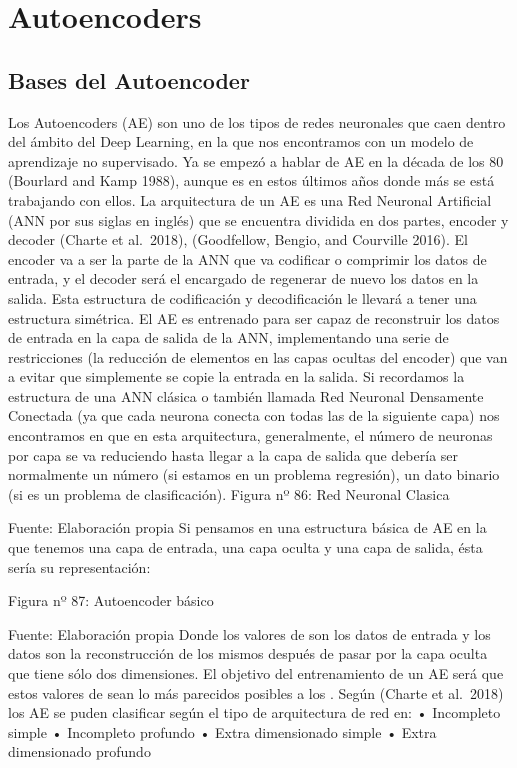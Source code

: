 \documentclass[
  a4paper,
  DIV=11,
  numbers=noendperiod]{scrreprt}
\begin{document}
\section{Autoencoders}\label{autoencoders}

\subsection{Bases del Autoencoder}\label{bases-del-autoencoder}

Los Autoencoders (AE) son uno de los tipos de redes neuronales que caen
dentro del ámbito del Deep Learning, en la que nos encontramos con un
modelo de aprendizaje no supervisado. Ya se empezó a hablar de AE en la
década de los 80 (Bourlard and Kamp 1988), aunque es en estos últimos
años donde más se está trabajando con ellos. La arquitectura de un AE es
una Red Neuronal Artificial (ANN por sus siglas en inglés) que se
encuentra dividida en dos partes, encoder y decoder (Charte et
al.~2018), (Goodfellow, Bengio, and Courville 2016). El encoder va a ser
la parte de la ANN que va codificar o comprimir los datos de entrada, y
el decoder será el encargado de regenerar de nuevo los datos en la
salida. Esta estructura de codificación y decodificación le llevará a
tener una estructura simétrica. El AE es entrenado para ser capaz de
reconstruir los datos de entrada en la capa de salida de la ANN,
implementando una serie de restricciones (la reducción de elementos en
las capas ocultas del encoder) que van a evitar que simplemente se copie
la entrada en la salida. Si recordamos la estructura de una ANN clásica
o también llamada Red Neuronal Densamente Conectada (ya que cada neurona
conecta con todas las de la siguiente capa) nos encontramos en que en
esta arquitectura, generalmente, el número de neuronas por capa se va
reduciendo hasta llegar a la capa de salida que debería ser normalmente
un número (si estamos en un problema regresión), un dato binario (si es
un problema de clasificación). Figura nº 86: Red Neuronal Clasica

Fuente: Elaboración propia Si pensamos en una estructura básica de AE en
la que tenemos una capa de entrada, una capa oculta y una capa de
salida, ésta sería su representación:

Figura nº 87: Autoencoder básico

Fuente: Elaboración propia Donde los valores de son los datos de entrada
y los datos son la reconstrucción de los mismos después de pasar por la
capa oculta que tiene sólo dos dimensiones. El objetivo del
entrenamiento de un AE será que estos valores de sean lo más parecidos
posibles a los . Según (Charte et al.~2018) los AE se puden clasificar
según el tipo de arquitectura de red en: • Incompleto simple •
Incompleto profundo • Extra dimensionado simple • Extra dimensionado
profundo
\end{document}
